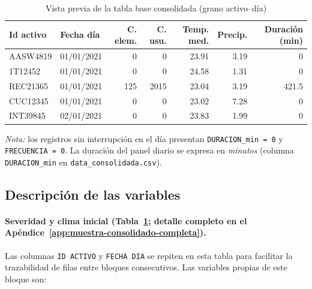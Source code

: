 \begin{table}[!htbp]
\centering
    \small
    \caption{Vista previa de la tabla base consolidada (grano activo--día)}
    \label{tab:muestra_consolidado_preview}
    \begin{tabular}{l l r r r r r}
    \toprule
    \textbf{Id activo} & \textbf{Fecha día} & \textbf{C. elem.} & \textbf{C. usu.} & \textbf{Temp. med.} & \textbf{Precip.} & \textbf{Duración (min)} \\
    \midrule
    AASW4819 & 01/01/2021 & 0   & 0    & 23.91 & 3.19 & 0     \\
    1T12452  & 01/01/2021 & 0   & 0    & 24.58 & 1.31 & 0     \\
    REC21365 & 01/01/2021 & 125 & 2015 & 23.04 & 3.19 & 421.5 \\
    CUC12345 & 01/01/2021 & 0   & 0    & 23.02 & 7.28 & 0     \\
    INT39845 & 02/01/2021 & 0   & 0    & 23.83 & 1.99 & 0     \\
    \bottomrule
    \end{tabular}
    \end{table}

    \noindent\textit{Nota:} los registros sin interrupción en el día presentan \texttt{DURACION\_min = 0} y \texttt{FRECUENCIA = 0}. La duración del panel diario se expresa en \textit{minutos} (columna \texttt{DURACION\_min} en \texttt{data\_consolidada.csv}).
    
\subsection{Descripción de las variables}
    \paragraph{Severidad y clima inicial (Tabla~\ref{tab:muestra_consolidado_preview}; detalle completo en el Apéndice~\ref{app:muestra-consolidado-completa}).}
    Las columnas \texttt{ID ACTIVO} y \texttt{FECHA DIA} se repiten en esta tabla para facilitar la trazabilidad de filas entre bloques consecutivos. Las variables propias de este bloque son:
    
